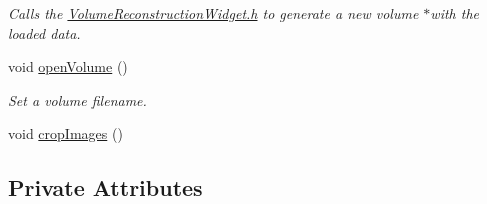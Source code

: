 \begin{DoxyCompactItemize}
\begin{DoxyCompactList}\small\item\em Calls the \hyperlink{_volume_reconstruction_widget_8h}{Volume\-Reconstruction\-Widget.\-h} to generate a new volume $\ast$with the loaded data. \end{DoxyCompactList}\item 
void \hyperlink{class_main_window_a8e8ac6f589b710d984e918f63c64e7da}{open\-Volume} ()
\begin{DoxyCompactList}\small\item\em Set a volume filename. \end{DoxyCompactList}\item 
void \hyperlink{class_main_window_ab821280b066f71fcb1a6b0390d99174c}{crop\-Images} ()
\end{DoxyCompactItemize}
\subsection*{Private Attributes}
